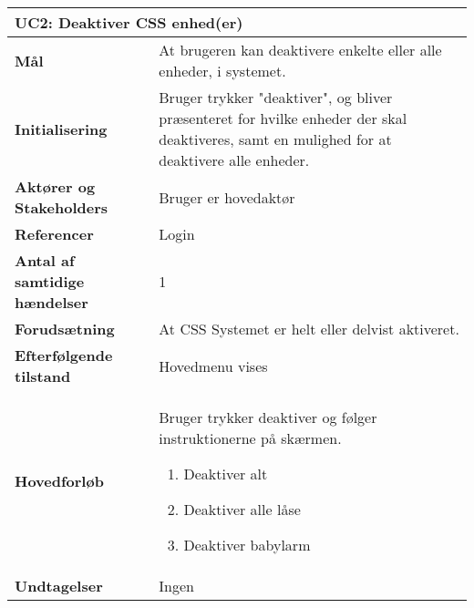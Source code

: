 \begin{table}[H] \centering
\begin{tabular}{|p{6cm}|p{8cm}|}
	\hline
\multicolumn{2}{|l|}{\textbf{UC2: Deaktiver CSS enhed(er)}} \\\hline
\textbf{Mål}	&
At brugeren kan deaktivere enkelte eller alle enheder, i systemet.
\\\hline
\textbf{Initialisering} &
Bruger trykker "deaktiver", og bliver
præsenteret for hvilke enheder der skal deaktiveres, samt en mulighed for at deaktivere alle
enheder. 
\\\hline
\textbf{Aktører og Stakeholders}	&
Bruger er hovedaktør
\\\hline
\textbf{Referencer} &
Login
\\\hline
\textbf{Antal af samtidige hændelser} &
1
\\\hline
\textbf{Forudsætning} &
At CSS Systemet er helt eller delvist aktiveret.
\\\hline
\textbf{Efterfølgende tilstand} &
Hovedmenu vises
\\\hline
\textbf{Hovedforløb}	&
Bruger trykker deaktiver og følger instruktionerne på skærmen.
\begin{enumerate}
\item Deaktiver alt
\item Deaktiver alle låse
\item Deaktiver babylarm
\end{enumerate}
\\\hline
\textbf{Undtagelser}	&
Ingen
\\\hline
	\end{tabular}
	\label{tab:UC2} 
\end{table}
